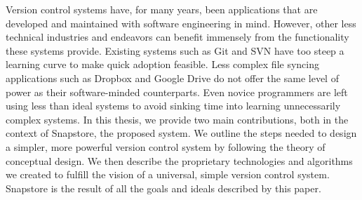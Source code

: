 % 
% 
%
Version control systems have, for many years, been applications that are developed and maintained with software engineering in mind. However, other less technical industries and endeavors can benefit immensely from the functionality these systems provide. Existing systems such as Git and SVN have too steep a learning curve to make quick adoption feasible. Less complex file syncing applications such as Dropbox and Google Drive do not offer the same level of power as their software-minded counterparts. Even novice programmers are left using less than ideal systems to avoid sinking time into learning unnecessarily complex systems. In this thesis, we provide two main contributions, both in the context of Snapstore, the proposed system. We outline the steps needed to design a simpler, more powerful version control system by following the theory of conceptual design. We then describe the proprietary technologies and algorithms we created to fulfill the vision of a universal, simple version control system. Snapstore is the result of all the goals and ideals described by this paper.
